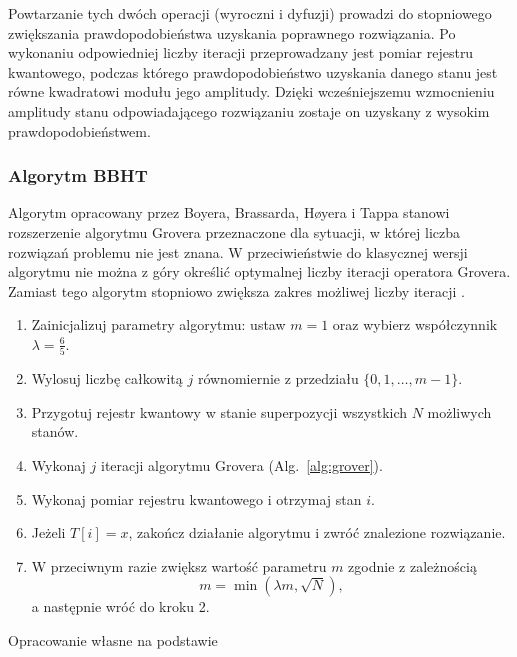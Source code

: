 Powtarzanie tych dwóch operacji (wyroczni i dyfuzji) prowadzi do stopniowego zwiększania prawdopodobieństwa uzyskania poprawnego rozwiązania. Po wykonaniu odpowiedniej liczby iteracji przeprowadzany jest pomiar rejestru kwantowego, podczas którego prawdopodobieństwo uzyskania danego stanu jest równe kwadratowi modułu jego amplitudy. Dzięki wcześniejszemu wzmocnieniu amplitudy stanu odpowiadającego rozwiązaniu zostaje on uzyskany z wysokim prawdopodobieństwem.

\newpage
\subsubsection{Algorytm BBHT}
Algorytm opracowany przez Boyera, Brassarda, Høyera i Tappa stanowi rozszerzenie algorytmu Grovera przeznaczone dla sytuacji, w której liczba rozwiązań problemu nie jest znana. W przeciwieństwie do klasycznej wersji algorytmu nie można z góry określić optymalnej liczby iteracji operatora Grovera. Zamiast tego algorytm stopniowo zwiększa zakres możliwej liczby iteracji \cite{bbht1996}.

\begin{algorithm}[H]
\caption{Algorytm BBHT}
\label{alg:bbht}
\begin{enumerate}

    \item Zainicjalizuj parametry algorytmu: ustaw $m=1$ oraz wybierz współczynnik $\lambda=\frac{6}{5}$.

    \item Wylosuj liczbę całkowitą $j$ równomiernie z przedziału $\{0,1,\dots,m-1\}$.

    \item Przygotuj rejestr kwantowy w stanie superpozycji wszystkich $N$ możliwych stanów.

    \item Wykonaj $j$ iteracji algorytmu Grovera (Alg.~\ref{alg:grover}).

    \item Wykonaj pomiar rejestru kwantowego i otrzymaj stan $i$.

    \item Jeżeli $T[i]=x$, zakończ działanie algorytmu i zwróć znalezione rozwiązanie.

    \item W przeciwnym razie zwiększ wartość parametru $m$ zgodnie z zależnością
    \[
        m=\min(\lambda m,\sqrt{N}),
    \]
    a następnie wróć do kroku 2.

\end{enumerate}
\begin{center}
\small Opracowanie własne na podstawie \cite{bbht1996}
\end{center}
\end{algorithm}

